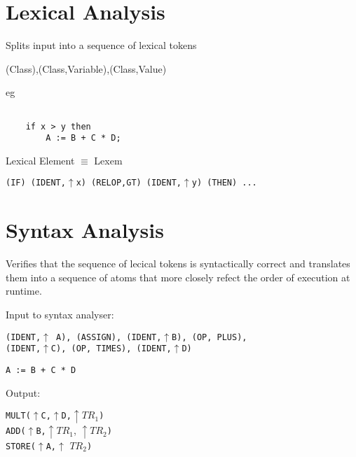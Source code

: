 \documentclass[a4paper,12pt]{article}
\begin{document}
\section{Lexical Analysis}

Splits input into a sequence of lexical tokens

(Class),(Class,Variable),(Class,Value)


eg

\begin{verbatim}

	if x > y then
		A := B + C * D;

\end{verbatim}

Lexical Element $\equiv$ Lexem

\verb!(IF) (IDENT,!$\uparrow$\verb!x) (RELOP,GT) (IDENT,!$\uparrow$\verb!y) (THEN) ...!

\section{Syntax Analysis}

Verifies that the sequence of lecical tokens is syntactically correct
and translates them into a sequence of atoms that more closely refect
the order of execution at runtime.


Input to syntax analyser:


\verb!(IDENT,!$\uparrow$\verb! A), (ASSIGN), (IDENT,!$\uparrow$\verb!B), (OP, PLUS),! \\
\verb!(IDENT,!$\uparrow$\verb!C), (OP, TIMES), (IDENT,!$\uparrow$\verb!D)!

\begin{verbatim}
A := B + C * D
\end{verbatim}

Output:

\verb!MULT(!$\uparrow$\verb!C,!$\uparrow$\verb!D,!$\uparrow TR_{1}$\verb!)! \\
\verb!ADD(!$\uparrow$\verb!B,!$\uparrow TR_{1}$, $\uparrow TR_{2}$\verb!)! \\
\verb!STORE(!$\uparrow$\verb!A,!$\uparrow$ $TR_{2}$\verb!)!
\end{document}
